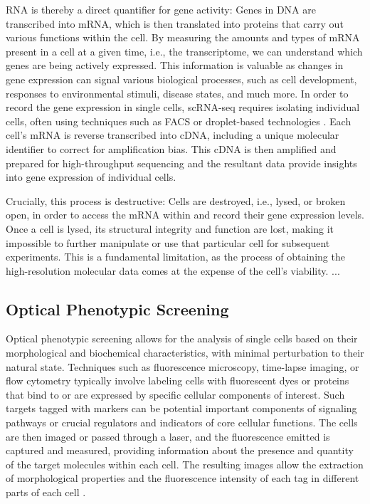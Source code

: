 RNA is thereby a direct quantifier for gene activity: Genes in DNA are transcribed into \acrfull{mRNA}, which is then translated into proteins that carry out various functions within the cell.
By measuring the amounts and types of mRNA present in a cell at a given time, i.e., the transcriptome, we can understand which genes are being actively expressed. This information is valuable as changes in gene expression can signal various biological processes, such as cell development, responses to environmental stimuli, disease states, and much more. 
In order to record the gene expression in single cells, scRNA-seq requires isolating individual cells, often using techniques such as \acrfull{FACS} \citep{} or droplet-based technologies \citep{}. Each cell's mRNA is reverse transcribed into \acrfull{cDNA}, including a unique molecular identifier to correct for amplification bias.
This cDNA is then amplified and prepared for high-throughput sequencing and the resultant data provide insights into gene expression of individual cells.

Crucially, this process is destructive: Cells are destroyed, i.e., lysed, or broken open, in order to access the mRNA within and record their gene expression levels.
Once a cell is lysed, its structural integrity and function are lost, making it impossible to further manipulate or use that particular cell for subsequent experiments.
This is a fundamental limitation, as the process of obtaining the high-resolution molecular data comes at the expense of the cell's viability. ...

\subsection{Optical Phenotypic Screening}

Optical phenotypic screening allows for the analysis of single cells based on their morphological and biochemical characteristics, with minimal perturbation to their natural state. 
Techniques such as fluorescence microscopy, time-lapse imaging, or flow cytometry typically involve labeling cells with fluorescent dyes or proteins that bind to or are expressed by specific cellular components of interest.
Such targets tagged with markers can be potential important components of signaling pathways or crucial regulators and indicators of core cellular functions. 
The cells are then imaged or passed through a laser, and the fluorescence emitted is captured and measured, providing information about the presence and quantity of the target molecules within each cell. 
The resulting images allow the extraction of morphological properties and the fluorescence intensity of each tag in different parts of each cell \citep{carpenter2006cellprofiler}.

